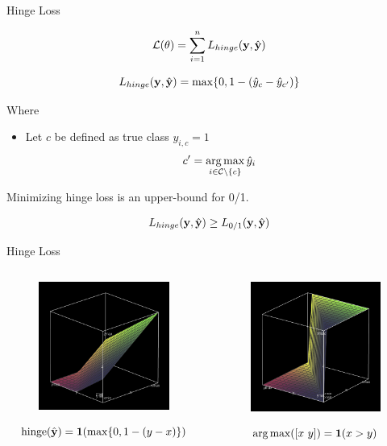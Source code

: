 \documentclass{beamer}
\begin{document}
\begin{frame}{Hinge Loss}

  \[{\mathcal{L}(\theta)} = \sum_{i=1}^n L_{hinge}(\mathbf{y},\hat{\mathbf{y}}) \] 


  \[ L_{hinge}(\mathbf{y}, \hat{\mathbf{y}}) =  \max\{0, 1 - (\hat{y}_{c} - \hat{y}_{c'}) \}  \]

  Where 
  \begin{itemize}
  \item   Let $c$ be defined as true class $y_{i, c} = 1$  
    \[c' = \argmax_{i \in \mcC \setminus\{c\}} \hat{y}_i \] 
  \end{itemize}

  \pause

  Minimizing hinge loss is an upper-bound for 0/1. 

  \[ L_{hinge}(\mathbf{y}, \hat{\mathbf{y}}) \geq L_{0/1}(\mathbf{y}, \hat{\mathbf{y}})\] 
\end{frame}
\begin{frame}{Hinge Loss}
  \begin{columns}[t]
    \begin{column}[t]{0.5\textwidth}


      \begin{figure}
        \centering
        \includegraphics[width=5cm]{hinge}

      \end{figure}
      \[\mathrm{hinge}(\hat{\mathbf{y}}) = \mathbf{1}(\max\{0, 1 - (y - x)\}) \]
    \end{column}

    \begin{column}[t]{0.5\textwidth}


      \begin{figure}
        \centering
      \includegraphics[width=5cm]{argmax}
      \end{figure}
      \[\argmax([x\ y]) = \indicator(x > y) \]      
    \end{column}
  \end{columns}
\end{frame}  
\end{document}
